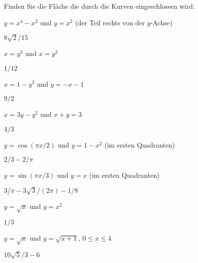 \begin{exercises}

\noindent Finden Sie die Fläche die durch die Kurven eingeschlossen wird:

\begin{exercise} $y=x^4-x^2$ und $y=x^2$ (der Teil rechts von der $y$-Achse)
\begin{answer} $8\sqrt2/15$
\end{answer}\end{exercise}

\begin{exercise} $x=y^3$ und $x=y^2$
\begin{answer} $1/12$
\end{answer}\end{exercise}

\begin{exercise} $x=1-y^2$ und $y=-x-1$
\begin{answer} $9/2$
\end{answer}\end{exercise}

\begin{exercise} $x=3y-y^2$ und $x+y=3$
\begin{answer} $4/3$
\end{answer}\end{exercise}

\begin{exercise} $y=\cos(\pi x/2)$ und $y=1- x^2$ (im ersten Quadranten)
\begin{answer} $2/3-2/\pi$
\end{answer}\end{exercise}

\begin{exercise} $y=\sin(\pi x/3)$ und $y=x$ (im ersten Quadranten)
\begin{answer} $3/\pi - 3\sqrt3/(2\pi)-1/8$
\end{answer}\end{exercise}

\begin{exercise} $y=\sqrt{x}$ und $y=x^2$
\begin{answer} $1/3$
\end{answer}\end{exercise}

\begin{exercise} $y=\sqrt x$ und $y=\sqrt{x+1}$, $0\le x\le 4$
\begin{answer} $10\sqrt{5}/3-6$
\end{answer}\end{exercise}


\end{exercises}
